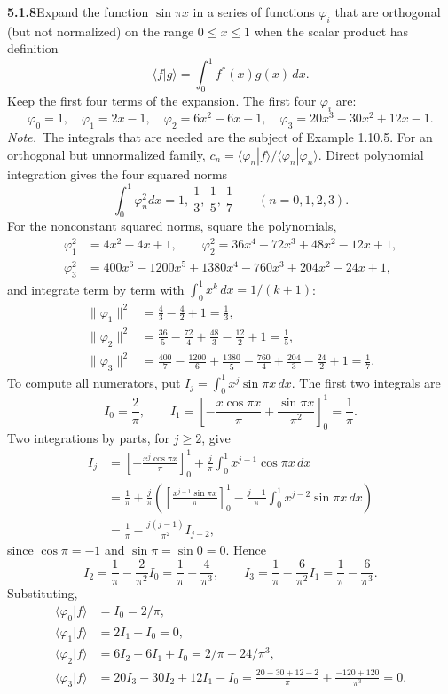\par\bigskip
\noindent\textbf{5.1.8}\quad Expand the function $\sin\pi x$ in a series of
functions $\varphi_{i}$ that are orthogonal (but not normalized) on the range
$0\le x\le1$ when the scalar product has definition
\[
\langle f|g\rangle=\int_{0}^{1}f^{*}(x)g(x)\,dx.
\]
Keep the first four terms of the expansion. The first four $\varphi_{i}$ are:
\[
\varphi_{0}=1,\quad\varphi_{1}=2x-1,\quad\varphi_{2}=6x^{2}-6x+1,\quad
\varphi_{3}=20x^{3}-30x^{2}+12x-1.
\]
\emph{Note.}~The integrals that are needed are the subject of Example 1.10.5.
\solution
For an orthogonal but unnormalized family,
$c_n=\langle\varphi_n|f\rangle/\langle\varphi_n|\varphi_n\rangle$.
Direct polynomial integration gives the four squared norms
\[
\int_0^1\varphi_n^2dx=1,\ \frac13,\ \frac15,\ \frac17
\qquad(n=0,1,2,3).
\]
For the nonconstant squared norms, square the polynomials,
\begin{align*}
\varphi_1^2&=4x^2-4x+1,\qquad
\varphi_2^2=36x^4-72x^3+48x^2-12x+1,\\
\varphi_3^2&=400x^6-1200x^5+1380x^4-760x^3+204x^2-24x+1,
\end{align*}
and integrate term by term with $\int_0^1x^k\,dx=1/(k+1)$:
\begin{align*}
\|\varphi_1\|^2&=\frac43-\frac42+1=\frac13,\\
\|\varphi_2\|^2&=\frac{36}5-\frac{72}4+\frac{48}3-\frac{12}2+1=\frac15,\\
\|\varphi_3\|^2&=\frac{400}7-\frac{1200}6+\frac{1380}5
 -\frac{760}4+\frac{204}3-\frac{24}2+1=\frac17.
\end{align*}
To compute all numerators, put $I_j=\int_0^1x^j\sin\pi x\,dx$.
The first two integrals are
\[
I_0=\frac2\pi,\qquad
I_1=\left[-\frac{x\cos\pi x}{\pi}
 +\frac{\sin\pi x}{\pi^2}\right]_0^1=\frac1\pi.
\]
Two integrations by parts, for $j\ge2$, give
\begin{align*}
I_j&=\left[-\frac{x^j\cos\pi x}{\pi}\right]_0^1
 +\frac{j}{\pi}\int_0^1x^{j-1}\cos\pi x\,dx\\
&=\frac1\pi+\frac{j}{\pi}\left(
 \left[\frac{x^{j-1}\sin\pi x}{\pi}\right]_0^1
 -\frac{j-1}{\pi}\int_0^1x^{j-2}\sin\pi x\,dx\right)\\
&=\frac1\pi-\frac{j(j-1)}{\pi^2}I_{j-2},
\end{align*}
since $\cos\pi=-1$ and $\sin\pi=\sin0=0$. Hence
\[
I_2=\frac1\pi-\frac2{\pi^2}I_0=\frac1\pi-\frac4{\pi^3},\qquad
I_3=\frac1\pi-\frac6{\pi^2}I_1=\frac1\pi-\frac6{\pi^3}.
\]
Substituting,
\begin{align*}
\langle\varphi_0|f\rangle&=I_0=2/\pi,\\
\langle\varphi_1|f\rangle&=2I_1-I_0=0,\\
\langle\varphi_2|f\rangle&=6I_2-6I_1+I_0
=2/\pi-24/\pi^3,\\
\langle\varphi_3|f\rangle&=20I_3-30I_2+12I_1-I_0
=\frac{20-30+12-2}{\pi}+\frac{-120+120}{\pi^3}=0.
\end{align*}

